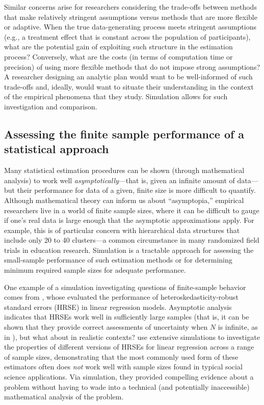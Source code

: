 \documentclass[
]{book}
\begin{document}
Similar concerns arise for researchers considering the trade-offs between methods that make relatively stringent assumptions versus methods that are more flexible or adaptive. When the true data-generating process meets stringent assumptions (e.g., a treatment effect that is constant across the population of participants), what are the potential gain of exploiting such structure in the estimation process?
Conversely, what are the costs (in terms of computation time or precision) of using more flexible methods that do not impose strong assumptions?
A researcher designing an analytic plan would want to be well-informed of such trade-offs and, ideally, would want to situate their understanding in the context of the empirical phenomena that they study.
Simulation allows for such investigation and comparison.

\subsection{Assessing the finite sample performance of a statistical approach}\label{assessing-the-finite-sample-performance-of-a-statistical-approach}

Many statistical estimation procedures can be shown (through mathematical analysis) to work well \emph{asymptotically}---that is, given an infinite amount of data---but their performance for data of a given, finite size is more difficult to quantify.
Although mathematical theory can inform us about ``asymptopia,'' empirical researchers live in a world of finite sample sizes, where it can be difficult to gauge if one's real data is large enough that the asymptotic approximations apply.
For example, this is of particular concern with hierarchical data structures that include only 20 to 40 clusters---a common circumstance in many randomized field trials in education research.
Simulation is a tractable approach for assessing the small-sample performance of such estimation methods or for determining minimum required sample sizes for adequate performance.

One example of a simulation investigating questions of finite-sample behavior comes from \citet{longUsingHeteroscedasticityConsistent2000}, whose evaluated the performance of heteroskedasticity-robust standard errors (HRSE) in linear regression models.
Asymptotic analysis indicates that HRSEs work well in sufficiently large samples (that is, it can be shown that they provide correct assessments of uncertainty when \(N\) is infinite, as in \citet{White1980heteroskedasticity}), but what about in realistic contexts?
\citet{longUsingHeteroscedasticityConsistent2000} use extensive simulations to investigate the properties of different versions of HRSEs for linear regression across a range of sample sizes, demonstrating that the most commonly used form of these estimators often does \emph{not} work well with sample sizes found in typical social science applications.
Via simulation, they provided compelling evidence about a problem without having to wade into a technical (and potentially inaccessible) mathematical analysis of the problem.
\end{document}
